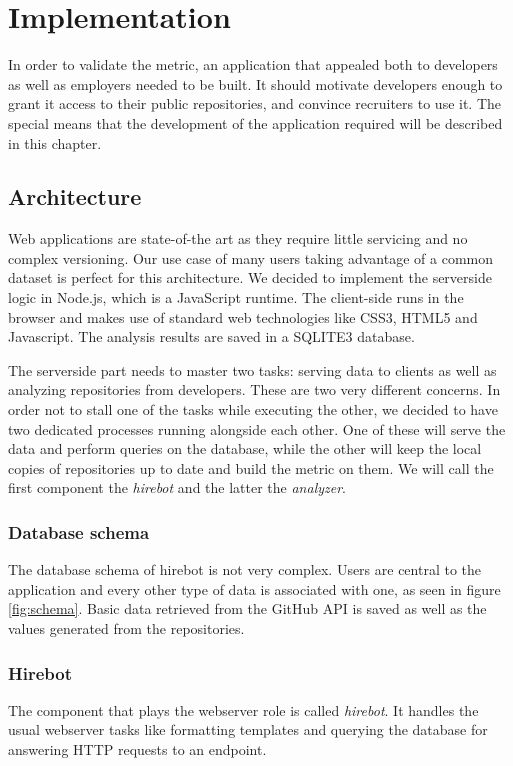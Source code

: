 \chapter{Implementation}\label{ch:implementation}
In order to validate the metric, an application that appealed both to developers as well as employers needed to be built. It should motivate developers enough to grant it access to their public repositories, and convince recruiters to use it. The special means that the development of the application required will be described in this chapter.

\section{Architecture}
Web applications are state-of-the art as they require little servicing and no complex versioning. Our use case of many users taking advantage of a common dataset is perfect for this architecture. We decided to implement the serverside logic in Node.js, which is a JavaScript runtime. The client-side runs in the browser and makes use of standard web technologies like CSS3, HTML5 and Javascript. The analysis results are saved in a SQLITE3 database.
\newline

The serverside part needs to master two tasks: serving data to clients as well as analyzing repositories from developers. These are two very different concerns. In order not to stall one of the tasks while executing the other, we decided to have two dedicated processes running alongside each other. One of these will serve the data and perform queries on the database, while the other will keep the local copies of repositories up to date and build the metric on them. We will call the first component the \textit{hirebot} and the latter the \textit{analyzer}.

\subsection{Database schema}
The database schema of hirebot is not very complex. Users are central to the application and every other type of data is associated with one, as seen in figure \ref{fig:schema}. Basic data retrieved from the GitHub API is saved as well as the values generated from the repositories.

\subsection{Hirebot}
The component that plays the webserver role is called \textit{hirebot}. It handles the usual webserver tasks like formatting templates and querying the database for answering HTTP requests to an endpoint.
\newline

